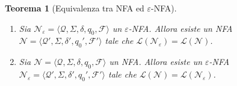 \documentclass[a4paper, 11pt, oneside]{book}
\theoremstyle{formale}
\newtheorem{theorem}{Teorema}
\begin{document}
    \begin{theorem}[Equivalenza tra NFA ed $\varepsilon$-NFA]
        \label{thm:equiv-nfa-enfa}
        \leavevmode
        \begin{enumerate}[label=\textup{(\alph*)}]
            \item Sia $\mathcal{N}_\varepsilon = \langle \mathcal{Q}, \Sigma, \delta, q_0,
                \mathcal{F} \rangle$ un $\varepsilon$-NFA. Allora esiste un NFA
                $\mathcal{N} = \langle \mathcal{Q}', \Sigma, \delta', q_0', \mathcal{F}'
                \rangle$ tale che $\mathcal{L}(\mathcal{N}_\varepsilon) =
                \mathcal{L}(\mathcal{N})$.
            \item Sia $\mathcal{N} = \langle \mathcal{Q}, \Sigma, \delta, q_0, \mathcal{F}
                \rangle$ un NFA. Allora esiste un $\varepsilon$-NFA $\mathcal{N}_\varepsilon
                = \langle \mathcal{Q}', \Sigma, \delta', q_0', \mathcal{F}' \rangle$ tale
                che $\mathcal{L}(\mathcal{N}) = \mathcal{L}(\mathcal{N}_\varepsilon)$.
        \end{enumerate}
    \end{theorem}
\end{document}
